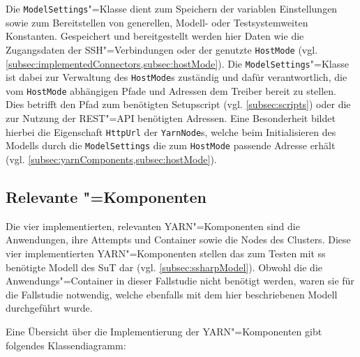 Die \texttt{ModelSettings}"=Klasse dient zum Speichern der variablen Einstellungen sowie zum Bereitstellen von generellen, Modell- oder Testsystemweiten Konstanten.
Gespeichert und bereitgestellt werden hier Daten wie \zB die Zugangsdaten der SSH"=Verbindungen oder der genutzte \texttt{HostMode} (vgl.  \cref{subsec:implementedConnectors,subsec:hostMode}).
Die \texttt{ModelSettings}"=Klasse ist dabei zur Verwaltung des \texttt{HostMode}s zuständig und dafür verantwortlich, die vom \texttt{HostMode} abhängigen Pfade und Adressen dem Treiber bereit zu stellen.
Dies betrifft \zB den Pfad zum benötigten Setupscript (vgl. \cref{subsec:scripts}) oder die zur Nutzung der \gls{REST}"=API benötigten Adressen.
Eine Besonderheit bildet hierbei die Eigenschaft \texttt{HttpUrl} der \texttt{YarnNode}s, welche beim Initialisieren des Modells durch die \texttt{ModelSettings} die zum \texttt{HostMode} passende Adresse erhält (vgl. \cref{subsec:yarnComponents,subsec:hostMode}).

\subsection{Relevante "=Komponenten}
\label{subsec:yarnComponents}

Die vier implementierten, relevanten \gls{YARN}"=Komponenten sind die Anwendungen, ihre \glspl{Attempt} und \gls{Container} sowie die Nodes des Clusters.
Diese vier implementierten \gls{YARN}"=Komponenten stellen das zum Testen mit \gls{ss} benötigte Modell des \gls{SuT} dar (vgl. \cref{subsec:ssharpModel}).
Obwohl die die Anwendungs"=Container in dieser Fallstudie nicht benötigt werden, waren sie für die Fallstudie \cite{Eberhardinger2018} notwendig, welche ebenfalls mit dem hier beschriebenen Modell durchgeführt wurde.

Eine Übersicht über die Implementierung der \gls{YARN}"=Komponenten gibt folgendes Klassendiagramm:

